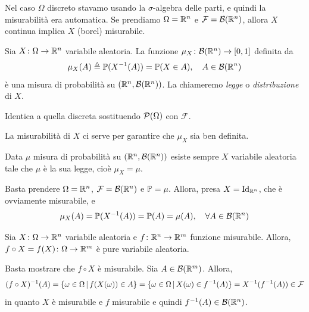 \documentclass[a4paper]{article}
\begin{document}
Nel caso \(\Omega\) discreto stavamo usando la \(\sigma\)-algebra delle parti,
e quindi la misurabilità era automatica.
Se prendiamo \(\Omega = \mathbb{R}^n\) e \(\mathcal F = \mathcal B(\mathbb{R}^n)\),
allora \(X\) continua implica \(X\) (borel) misurabile.

\begin{snippetproposition}{}
    Sia \(X \colon \Omega \to \mathbb{R}^n\)
    variabile aleatoria. La funzione \(\mu_X \colon \mathcal B(\mathbb{R}^n) \to [0,1]\)
    definita da \[
        \mu_X(A) \triangleq \mathbb P(X^{-1}(A))
        = \mathbb P(X \in A), \quad A \in \mathcal B(\mathbb{R}^n)
    \]
    è una misura di probabilità su \((\mathbb{R}^n, \mathcal B(\mathbb{R}^n))\).
    La chiameremo \emph{legge} o \emph{distribuzione} di \(X\).
\end{snippetproposition}

\begin{snippetproof}{}
    Identica a quella discreta sostituendo \(\mathcal P(\Omega)\)
    con \(\mathcal F\).
\end{snippetproof}

La misurabilità di \(X\) ci serve per garantire che \(\mu_X\)
sia ben definita.

\begin{snippetproposition}{}
    Data \(\mu\) misura di probabilità su \((\mathbb{R}^n, \mathcal B(\mathbb{R}^n))\)
    esiste sempre \(X\) variabile aleatoria tale che \(\mu\)
    è la sua legge, cioè \(\mu_X = \mu\).
\end{snippetproposition}

\begin{snippetproof}{}
    Basta prendere \(\Omega = \mathbb{R}^n\),
    \(\mathcal F = \mathcal B(\mathbb{R}^n)\)
    e \(\mathbb P = \mu\). Allora, presa \(X = \operatorname{Id}_{\mathbb{R}^n}\),
    che è ovviamente misurabile, e \[
        \mu_X(A) = \mathbb P(X^{-1}(A))
        = \mathbb P(A) = \mu(A), \quad \forall A \in \mathcal B(\mathbb{R}^n)
    \]
\end{snippetproof}

\begin{snippetproposition}{}
    Sia \(X \colon \Omega \to \mathbb{R}^n\)
    variabile aleatoria e \(f \colon \mathbb{R}^n \to \mathbb{R}^m\)
    funzione misurabile. Allora,
    \(f \circ X = f(X) \colon \Omega \to \mathbb{R}^m\) è pure variabile aleatoria.
\end{snippetproposition}

\begin{snippetproof}{}
    Basta mostrare che \(f \circ X\) è misurabile.
    Sia \(A \in \mathcal B(\mathbb{R}^m)\).
    Allora, \[
        (f\circ X)^{-1}(A) = \{
            \omega \in \Omega \,|\, f(X(\omega)) \in A
        \}
        = \{
            \omega \in \Omega \,|\, X(\omega) \in f^{-1}(A)
        \}
        = X^{-1}(f^{-1}(A)) \in \mathcal F
    \]
    in quanto \(X\) è misurabile e \(f\) misurabile e quindi \(f^{-1}(A) \in \mathcal B(\mathbb{R}^n)\).
\end{snippetproof}
\end{document}
